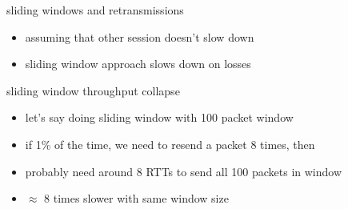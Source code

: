\begin{frame}{sliding windows and retransmissions}
    \begin{itemize}
    \item assuming that other session doesn't slow down
    \vspace{.5cm}
    \item sliding window approach slows down on losses
    \end{itemize}
\end{frame}

\begin{frame}{sliding window throughput collapse}
\begin{itemize}
\item let's say doing sliding window with 100 packet window
\item if 1\% of the time, we need to resend a packet 8 times, then
\item probably need around 8 RTTs to send all 100 packets in window
\vspace{.5cm}
\item<2-> $\approx$ 8 times slower with same window size
\end{itemize}
\end{frame}


